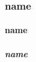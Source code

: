\documentclass[12pt]{article}
\newcommand\"{quote}
\begin{document}
\subsubsection{name}
\paragraph{name}
\subparagraph{name}


\frontmatter[arg=value]

\mainmatter

\backmatter

\end{document}
